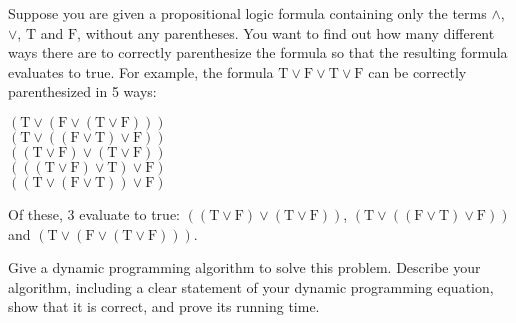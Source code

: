 \problem{}
Suppose you are given a propositional logic formula containing only the terms $\land$, $\lor$, $\text{T}$ and $\text{F}$, without any parentheses. You want to find out how many different ways there are to correctly parenthesize the formula so that the resulting formula evaluates to true. For example, the formula $\text{T} \lor \text{F} \lor \text{T} \lor \text{F}$ can be correctly parenthesized in 5 ways:
\begin{center}
$(\text{T} \lor (\text{F} \lor (\text{T} \lor \text{F})))$ \\
$(\text{T} \lor ((\text{F} \lor \text{T}) \lor \text{F}))$ \\
$((\text{T} \lor \text{F}) \lor (\text{T} \lor \text{F}))$ \\
$(((\text{T} \lor \text{F}) \lor \text{T}) \lor \text{F})$ \\
$((\text{T} \lor (\text{F} \lor \text{T})) \lor \text{F})$
\end{center}
Of these, 3 evaluate to true: $((\text{T} \lor \text{F}) \lor (\text{T} \lor \text{F}))$, $(\text{T} \lor ((\text{F} \lor \text{T}) \lor \text{F}))$ and $(\text{T} \lor (\text{F} \lor (\text{T} \lor \text{F})))$.

Give a dynamic programming algorithm to solve this problem. Describe your algorithm, including a clear statement of your dynamic programming equation, show that it is correct, and prove its running time.

\solution{}













\newpage